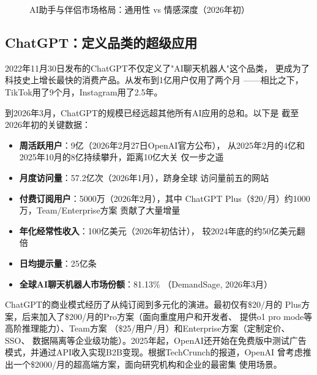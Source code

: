 \begin{figure}[htbp]
\caption{AI助手与伴侣市场格局：通用性 vs 情感深度（2026年初）}
\label{fig:assistant-landscape}
\end{figure}

\subsection{ChatGPT：定义品类的超级应用}
\label{subsec:chatgpt}

2022年11月30日发布的ChatGPT不仅定义了"AI聊天机器人"这个品类，
更成为了科技史上增长最快的消费产品。从发布到1亿用户仅用了两个月
——相比之下，TikTok用了9个月，Instagram用了2.5年。

到2026年3月，ChatGPT的规模已经远超其他所有AI应用的总和。以下是
截至2026年初的关键数据：

\begin{itemize}
  \item \textbf{周活跃用户}：9亿（2026年2月27日OpenAI官方公布），
    从2025年2月的4亿和2025年10月的8亿持续攀升，距离10亿大关
    仅一步之遥
  \item \textbf{月度访问量}：57.2亿次（2026年1月），跻身全球
    访问量前五的网站
  \item \textbf{付费订阅用户}：5000万（2026年2月），其中
    ChatGPT Plus（\$20/月）约1000万，Team/Enterprise方案
    贡献了大量增量
  \item \textbf{年化经常性收入}：100亿美元（2026年初估计），
    较2024年底的约50亿美元翻倍
  \item \textbf{日均提示量}：25亿条
  \item \textbf{全球AI聊天机器人市场份额}：81.13\%
    （DemandSage, 2026年3月）
\end{itemize}

ChatGPT的商业模式经历了从纯订阅到多元化的演进。最初仅有\$20/月的
Plus方案，后来加入了\$200/月的Pro方案（面向重度用户和开发者、
提供o1 pro mode等高阶推理能力）、Team方案
（\$25/用户/月）和Enterprise方案（定制定价、SSO、
数据隔离等企业级功能）。2025年起，OpenAI还开始在免费版中测试广告
模式，并通过API收入实现B2B变现。根据TechCrunch的报道，OpenAI
曾考虑推出一个\$2000/月的超高端方案，面向研究机构和企业的最密集
使用场景。

